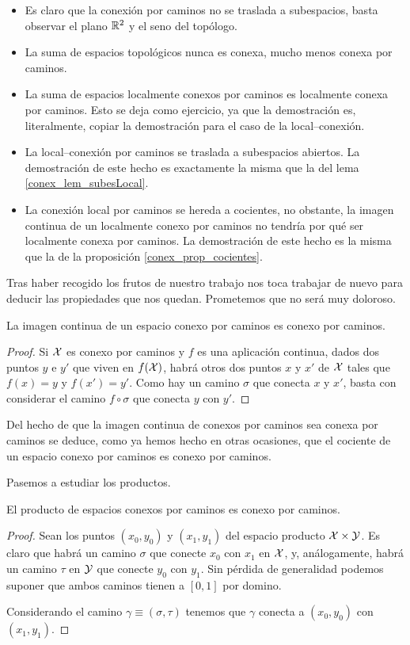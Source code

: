 \begin{itemize}
	\item Es claro que la conexión por caminos no se traslada a subespacios, basta observar el plano $\mathbb{R}^2$ y el seno del topólogo.
	\item La suma de espacios topológicos nunca es conexa, mucho menos conexa por caminos.
	\item La suma de espacios localmente conexos por caminos es localmente conexa por caminos. Esto se deja como ejercicio, ya que la demostración es, literalmente, copiar la demostración para el caso de la local--conexión.
	\item La local--conexión por caminos se traslada a subespacios abiertos. La demostración de este hecho es exactamente la misma que la del lema \ref{conex_lem_subesLocal}.
	\item La conexión local por caminos se hereda a cocientes, no obstante, la imagen continua de un localmente conexo por caminos no tendría por qué ser localmente conexa por caminos. La demostración de este hecho es la misma que la de la proposición \ref{conex_prop_cocientes}.
\end{itemize}
Tras haber recogido los frutos de nuestro trabajo nos toca trabajar de nuevo para deducir las propiedades que nos quedan. Prometemos que no será muy doloroso.
\begin{prop}
	La imagen continua de un espacio conexo por caminos es conexo por caminos.
\end{prop}
\begin{proof}
	Si $\mathcal{X}$ es conexo por caminos y $f$ es una aplicación continua, dados dos puntos $y$ e $y'$ que viven en $f(\mathcal{X})$, habrá otros dos puntos $x$ y $x'$ de $\mathcal{X}$ tales que $f(x)=y$ y $f(x')=y'$. Como hay un camino $\sigma$ que conecta $x$ y $x'$, basta con considerar el camino $f\circ \sigma$ que conecta $y$ con $y'$.
\end{proof}
\begin{obs}
	Del hecho de que la imagen continua de conexos por caminos sea conexa por caminos se deduce, como ya hemos hecho en otras ocasiones, que el cociente de un espacio conexo por caminos es conexo por caminos.
\end{obs}
Pasemos a estudiar los productos.
\begin{prop}
	El producto de espacios conexos por caminos es conexo por caminos.
\end{prop}
\begin{proof}
	Sean los puntos $(x_0,y_0)$ y $(x_1,y_1)$ del espacio producto $\mathcal{X}\times \mathcal{Y}$. Es claro que habrá un camino $\sigma$ que conecte $x_0$ con $x_1$ en $\mathcal{X}$, y, análogamente, habrá un camino $\tau$ en $\mathcal{Y}$ que conecte $y_0$ con $y_1$. Sin pérdida de generalidad podemos suponer que ambos caminos tienen a $[0,1]$ por domino. 
	
	Considerando el camino $\gamma\equiv(\sigma,\tau)$ tenemos que $\gamma$ conecta a $(x_0,y_0)$ con $(x_1,y_1)$.
\end{proof}
